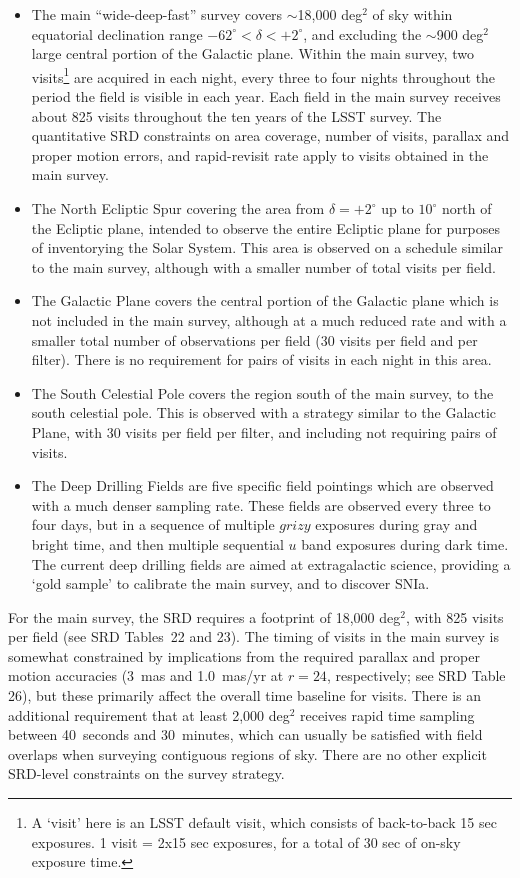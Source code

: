 \documentclass[DM,lsstdraft,toc,usenatbib]{lsstdoc}
\begin{document}
\begin{itemize}
\item The main ``wide-deep-fast'' survey covers $\sim$18,000 deg$^2$ of sky within equatorial declination
range $-62^\circ < \delta < +2^\circ$, and excluding the $\sim$900 deg$^2$ large central portion of the Galactic 
plane. Within the main survey, two visits\footnote{A `visit' here is an LSST default visit, which 
consists of back-to-back 15 sec exposures. 1 visit = 2x15 sec exposures, for a total of 30 sec of on-sky exposure time.} 
are acquired in each night, every three to four nights throughout the period the field is visible in each year. Each
field in the main survey receives about 825 visits throughout the ten years of the LSST survey. The quantitative SRD 
constraints on area coverage, number of visits, parallax and proper motion errors, and rapid-revisit rate apply to 
visits obtained in the main survey.
\item The North Ecliptic Spur covering the area from $\delta = +2^\circ$ up to $10^\circ$ north of the Ecliptic plane, 
intended to observe the entire Ecliptic plane for purposes of inventorying the Solar System. This area is observed on
a schedule similar to the main survey, although with a smaller number of total visits per field.
\item The Galactic Plane covers the central portion of the Galactic plane which is not included in the main survey, although at a 
much reduced rate and with a smaller total number of observations per field (30 visits per field and per filter). There is no 
requirement for pairs of visits in each night in this area.
\item The South Celestial Pole covers the region south of the main survey, to the south celestial pole. This is observed with
a strategy similar to the Galactic Plane, with 30 visits per field per filter, and including not requiring pairs of visits. 
\item The Deep Drilling Fields are five specific field pointings which are observed with a much denser sampling rate. These fields
are observed every three to four days, but in a sequence of multiple $grizy$ exposures during gray and bright time, and then
multiple sequential $u$ band exposures during dark time. The current deep drilling fields are aimed at extragalactic
science, providing a `gold sample' to calibrate the main survey, and to discover SNIa. 
\end{itemize}
For the main survey, the SRD requires a footprint of 18,000 deg$^2$, with 825 visits per field (see SRD Tables~22 and 23). 
The timing of visits in the main survey is somewhat constrained by implications from the required 
parallax and proper motion accuracies (3~mas and 1.0~mas/yr at $r=24$, respectively; see SRD Table 26), but these primarily 
affect the overall time baseline for visits.  There is an additional requirement that at least 2,000 deg$^2$ receives rapid time 
sampling between 40~seconds and 30~minutes, which can usually be satisfied with field overlaps when surveying contiguous regions
of sky. There are no other explicit SRD-level constraints on the survey strategy. 
\end{document}
